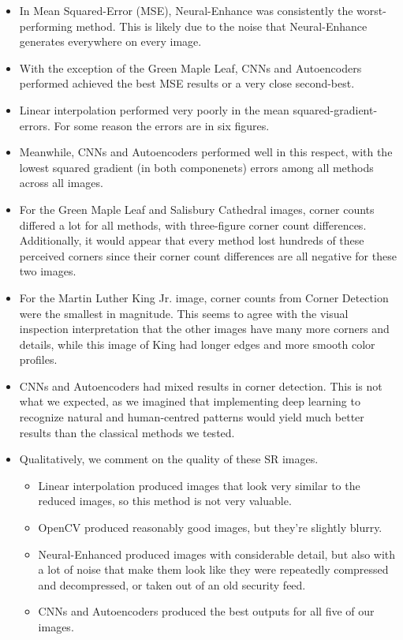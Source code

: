 \documentclass[letterpaper,12pt]{article}
\begin{document}
\begin{itemize}
    \item In Mean Squared-Error (MSE), Neural-Enhance was consistently the worst-performing method. This is likely due to the noise that Neural-Enhance generates everywhere on every image.
    \item With the exception of the Green Maple Leaf, CNNs and Autoencoders performed achieved the best MSE results or a very close second-best.
    \item Linear interpolation performed very poorly in the mean squared-gradient-errors. For some reason the errors are in six figures.
    \item Meanwhile, CNNs and Autoencoders performed well in this respect, with the lowest squared gradient (in both componenets) errors among all methods across all images.
    \item For the Green Maple Leaf and Salisbury Cathedral images, corner counts differed a lot for all methods, with three-figure corner count differences. Additionally, it would appear that every method lost hundreds of these perceived corners since their corner count differences are all negative for these two images.
    \item For the Martin Luther King Jr. image, corner counts from Corner Detection were the smallest in magnitude. This seems to agree with the visual inspection interpretation that the other images have many more corners and details, while this image of King had longer edges and more smooth color profiles.
    \item CNNs and Autoencoders had mixed results in corner detection. This is not what we expected, as we imagined that implementing deep learning to recognize natural and human-centred patterns would yield much better results than the classical methods we tested.
    \item Qualitatively, we comment on the quality of these SR images.
        \begin{itemize}
            \item Linear interpolation produced images that look very similar to the reduced images, so this method is not very valuable.
            \item OpenCV produced reasonably good images, but they're slightly blurry.
            \item Neural-Enhanced produced images with considerable detail, but also with a lot of noise that make them look like they were repeatedly compressed and decompressed, or taken out of an old security feed.
            \item CNNs and Autoencoders produced the best outputs for all five of our images.
        \end{itemize}
\end{itemize}
\end{document}
